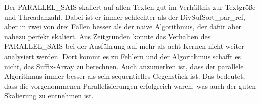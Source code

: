 \FloatBarrier
{}
\noindent Der PARALLEL\_SAIS skaliert auf allen Texten gut im Verhältnis zur Textgröße und Threadanzahl. Dabei ist er immer schlechter als der DivSufSort\_par\_ref, aber in zwei von drei Fällen besser als der naive Algorithmus, der dafür aber nahezu perfekt skaliert. Aus Zeitgründen konnte das Verhalten des PARALLEL\_SAIS bei der Ausführung auf mehr als acht Kernen nicht weiter analysiert werden. Dort kommt es zu Fehlern und der Algorithmus schafft es nicht, das Suffix-Array zu berechnen. Auch anzumerken ist, dass der parallele Algorithmus immer besser als sein sequentielles Gegenstück ist. Das bedeutet, dass die vorgenommenen Parallelisierungen erfolgreich waren, was auch der guten Skalierung zu entnehmen ist.